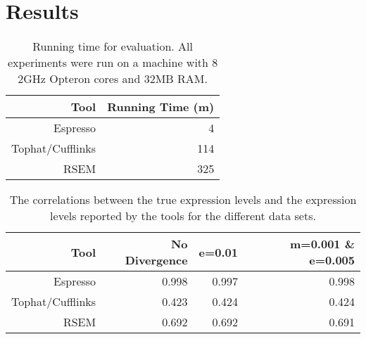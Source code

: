 \documentclass{bioinfo}
\begin{document}
\section{Results}

\begin{table}
\begin{center}
\begin{tabular}{|r|r|}
\hline
\textbf{Tool}    & \textbf{Running Time (m)} \\
\hline
Espresso         &   4 \\
Tophat/Cufflinks & 114 \\
RSEM             & 325 \\
\hline
\end{tabular}
\end{center}
\caption{Running time for evaluation. All experiments were run on a machine with 8 2GHz Opteron cores and 32MB RAM.}
\label{tbl:time}
\end{table}

\begin{table*}
\begin{center}
\begin{tabular}{|r|r|r|r|}
\hline
\textbf{Tool}    & \textbf{No Divergence} & \textbf{e=0.01} & \textbf{m=0.001 \& e=0.005} \\
\hline
Espresso         &   0.998 & 0.997 & 0.998 \\
Tophat/Cufflinks &   0.423 & 0.424 & 0.424 \\
RSEM             &   0.692 & 0.692 & 0.691 \\
\hline
\end{tabular}
\end{center}
\caption{
The correlations between the true expression levels and the expression levels reported by
the tools for the different data sets.
}
\label{tbl:cor}
\end{table*}
\end{document}
